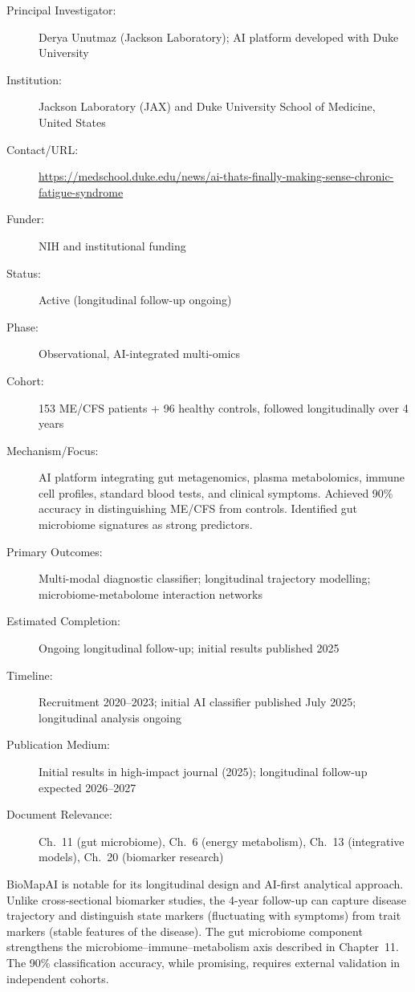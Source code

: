 \begin{description}
    \item[Principal Investigator:] Derya Unutmaz (Jackson Laboratory);
        AI platform developed with Duke University
    \item[Institution:] Jackson Laboratory (JAX) and Duke University
        School of Medicine, United States
    \item[Contact/URL:] \url{https://medschool.duke.edu/news/ai-thats-finally-making-sense-chronic-fatigue-syndrome}
    \item[Funder:] NIH and institutional funding
    \item[Status:] Active (longitudinal follow-up ongoing)
    \item[Phase:] Observational, AI-integrated multi-omics
    \item[Cohort:] 153 ME/CFS patients + 96 healthy controls, followed
        longitudinally over 4 years
    \item[Mechanism/Focus:] AI platform integrating gut metagenomics, plasma
        metabolomics, immune cell profiles, standard blood tests, and clinical
        symptoms.  Achieved 90\% accuracy in distinguishing ME/CFS from
        controls.  Identified gut microbiome signatures as strong predictors.
    \item[Primary Outcomes:] Multi-modal diagnostic classifier; longitudinal
        trajectory modelling; microbiome-metabolome interaction networks
    \item[Estimated Completion:] Ongoing longitudinal follow-up; initial
        results published 2025
    \item[Timeline:] Recruitment 2020--2023; initial AI classifier published
        July 2025; longitudinal analysis ongoing
    \item[Publication Medium:] Initial results in high-impact journal (2025);
        longitudinal follow-up expected 2026--2027
    \item[Document Relevance:] Ch.~11 (gut microbiome), Ch.~6 (energy
        metabolism), Ch.~13 (integrative models), Ch.~20 (biomarker research)
\end{description}

BioMapAI is notable for its longitudinal design and AI-first analytical
approach.  Unlike cross-sectional biomarker studies, the 4-year follow-up
can capture disease trajectory and distinguish state markers (fluctuating with
symptoms) from trait markers (stable features of the disease).  The gut
microbiome component strengthens the microbiome--immune--metabolism axis
described in Chapter~11.  The 90\% classification accuracy, while promising,
requires external validation in independent cohorts.

